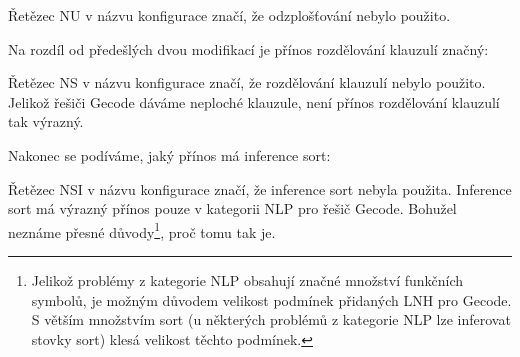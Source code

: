 Řetězec NU v názvu konfigurace značí, že
odzplošťování nebylo použito.

\newpage

Na rozdíl od předešlých dvou modifikací je přínos
rozdělování klauzulí značný:


Řetězec NS v názvu konfigurace značí, že
rozdělování klauzulí nebylo použito.
Jelikož řešiči Gecode dáváme neploché klauzule,
není přínos rozdělování klauzulí tak výrazný.


\newpage

Nakonec se podíváme, jaký přínos má inference sort:


Řetězec NSI v názvu konfigurace značí, že
inference sort nebyla použita.
Inference sort má výrazný přínos
pouze v kategorii NLP pro řešič Gecode.
Bohužel neznáme přesné důvody\footnote{Jelikož
problémy z kategorie NLP obsahují značné množství
funkčních symbolů, je možným důvodem
velikost podmínek přidaných LNH pro Gecode.
S větším množstvím sort (u některých problémů z kategorie NLP
lze inferovat stovky sort)
klesá velikost těchto podmínek.},
proč tomu tak je.

